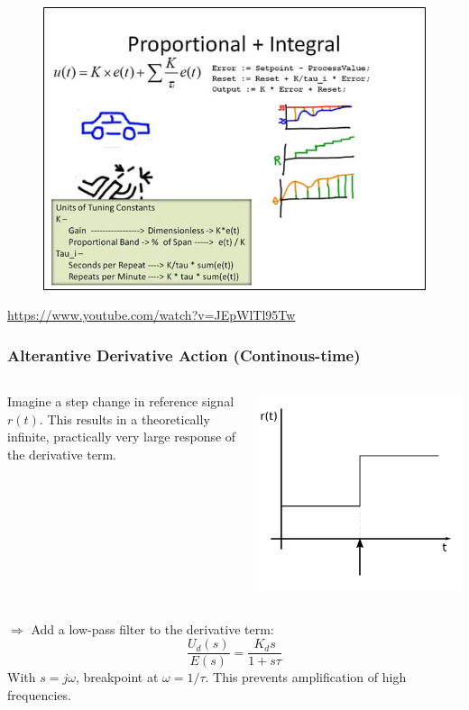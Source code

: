 \begin{frame}
	\begin{figure}
\centering
\includegraphics[width=0.7\linewidth]{img/PID_video}
\end{figure}
	\url{https://www.youtube.com/watch?v=JEpWlTl95Tw}
\end{frame}

\begin{frame}
	\frametitle{Alterantive Derivative Action (Continous-time)}
		\begin{columns}
			\begin{column}{0.7\linewidth}
				Imagine a step change in reference signal $r(t)$. 
				This results in a theoretically infinite, practically very large response of
				the derivative term.  
			\end{column}
			\begin{column}{0.3\linewidth}
				\includegraphics[width=\linewidth]{img/piecewise-setpoint}
			\end{column}
		\end{columns}
		$\Rightarrow$ Add a low-pass filter to the derivative term:
		\begin{equation*}
			\frac{U_d(s)}{E(s)} = \frac{K_d s}{1+s\tau}
		\end{equation*}
		With $s=j\omega$, breakpoint at $\omega=1/\tau$. This prevents amplification of high frequencies. 
\end{frame}

